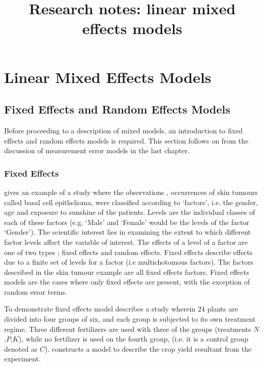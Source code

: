 \documentclass[12pt, a4paper]{report}
\title{Research notes: linear mixed effects models}
\author{ } \date{ }
\theoremstyle{plain}
\theoremstyle{definition}
\theoremstyle{remark}
\begin{document}
	\tableofcontents
\chapter{Linear Mixed Effects Models}

\section{Fixed Effects and Random Effects Models}
Before proceeding to a description of mixed models, an
introduction to fixed effects and random effects models is
required. This section follows on from the discussion of
measurement error models in the last chapter.

\subsection{Fixed Effects}
\citet{McCullSearle} gives an example of a study where the
observations , occurrences of skin tumours called basal cell
epithelioma, were classified according to `factors', i.e. the
gender, age and exposure to sunshine of the patients. Levels are
the individual classes of each of these factors (e.g. `Male' and
`Female' would be the levels of the factor `Gender'). The
scientific interest lies in examining the extent to which
different factor levels affect the variable of interest. The
effects of a level of a factor are one of two types ; fixed
effects and random effects. Fixed effects describe effects due to
a finite set of levels for a factor (i.e multichotomous factors).
The factors described in the skin tumour example are all fixed
effects factors. Fixed effects models are the cases where only
fixed effects are present, with the exception of random error
terms.

To demonstrate fixed effects model \citet{Searle} describes a
study wherein $24$ plants are divided into four groups of six, and
each group is subjected to its own treatment regime. Three
different fertilizers are used with three of the groups
(treatments $N$,$P$,$K$), while no fertilizer is used on the
fourth group, (i.e. it is a control group denoted as $C$).
\citet{Searle} constructs a model to describe the crop yield
resultant from the experiment.
\end{document}
